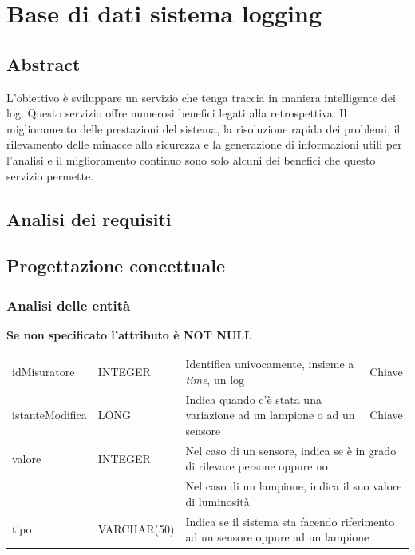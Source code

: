 \section{Base di dati sistema logging}\label{sec:sbd-sistema-logging}

\subsection{Abstract}

L’obiettivo è sviluppare un servizio che tenga traccia in maniera intelligente dei log. Questo servizio offre numerosi benefici legati alla retrospettiva. Il miglioramento delle prestazioni del sistema, la risoluzione rapida dei problemi, il rilevamento delle minacce alla sicurezza e la generazione di informazioni utili per l'analisi e il miglioramento continuo sono solo alcuni dei benefici che questo servizio permette.

\subsection{Analisi dei requisiti}

\subsection{Progettazione concettuale}

\subsubsection{Analisi delle entità}

\textbf{Se non specificato l'attributo è NOT NULL}

\begin{center}
    \begin{tabularx}{\textwidth}{|l|l|l|X|}
        \hline
        \rowcolor{gray!30}
        \multicolumn{4}{|c|}{\textbf{LOG}}\\
        \hline
        idMisuratore & INTEGER & Identifica univocamente, insieme a {\it{time}}, un log & Chiave\\
        \hline
        istanteModifica & LONG & Indica quando c'è stata una variazione ad un lampione o ad un sensore & Chiave\\
        \hline
        valore & INTEGER & \multicolumn{2}{l|}{Nel caso di un sensore, indica se è in grado di rilevare persone oppure no} \\
        & & \multicolumn{2}{l|}{Nel caso di un lampione, indica il suo valore di luminosità} \\
        \hline
        tipo & VARCHAR(50) & \multicolumn{2}{l|}{Indica se il sistema sta facendo riferimento ad un sensore oppure ad un lampione} \\
        \hline
    \end{tabularx}
\end{center}

